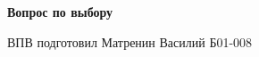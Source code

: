 

\shiftedText{0.5cm}{14cm}
{

    \begin{center}
    \vspace*{1.0cm}

        {\bf\huge Вопрос по выбору }

    \vspace*{0.2cm}

        {\bf\Large \topic }

    \vspace*{0.8cm}

        {\Large ВПВ подготовил Матренин Василий Б01-008 }

    \vspace*{1.6cm}

    \end{center}

}

\tableofcontents

\newpage
